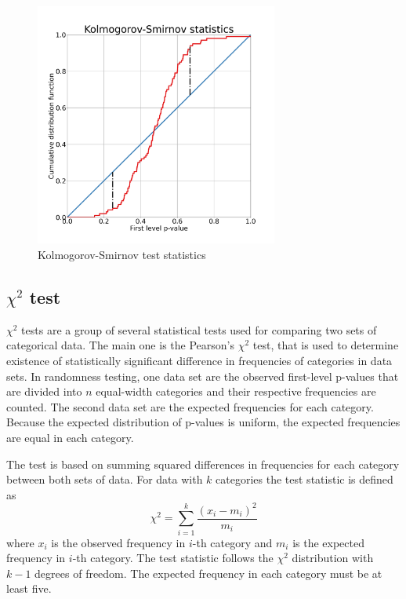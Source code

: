 \documentclass[
  digital,     %
  oneside,     %
  nosansbold,  %
  nocolorbold, %
  nolof,         %
  nolot,         %
]{fithesis4}
\begin{document}
\begin{figure}
  \begin{center}
    \includegraphics[width=8cm]{figures/ks_d.png}
  \end{center}
  \caption{Kolmogorov-Smirnov test statistics}
  \label{fig:ks_d}
\end{figure}


\subsection{$\chi^2$ test}
$\chi^2$ tests are a group of several statistical tests used for comparing two sets of categorical data. The main one is the Pearson's $\chi^2$ test, that is used to determine existence of statistically significant difference in frequencies of categories in data sets. In randomness testing, one data set are the observed first-level p-values that are divided into $n$ equal-width categories and their respective frequencies are counted. The second data set are the expected frequencies for each category. Because the expected distribution of p-values is uniform, the expected frequencies are equal in each category. 
 
The test is based on summing squared differences in frequencies for each category between both sets of data. For data with $k$ categories the test statistic is defined as \[\chi^2 = \sum_{i=1}^{k} \dfrac{(x_i - m_i)^2}{m_i} \]
where $x_i$ is the observed frequency in $i$-th category and $m_i$ is the expected frequency in $i$-th category. The test statistic follows the $\chi^2$ distribution with $k-1$ degrees of freedom. The expected frequency in each category must be at least five. \cite[p. 171]{stat-procedures}
\end{document}
